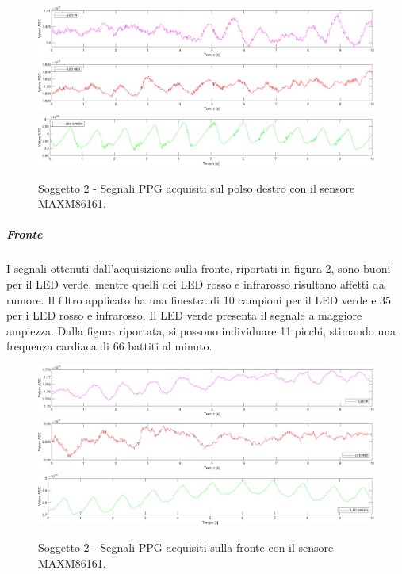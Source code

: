 \begin{figure}[h]
	\centering
	\includegraphics[width=1\linewidth]{ImageFiles/Misure Preliminari/Soggetto 2/maxm86161/polso_inferiore_ir_moving_avg}
	\includegraphics[width=1\linewidth]{ImageFiles/Misure Preliminari/Soggetto 2/maxm86161/polso_inferiore_red_moving_avg}
	\includegraphics[width=1\linewidth]{ImageFiles/Misure Preliminari/Soggetto 2/maxm86161/polso_inferiore_green_moving_avg}
	\caption{Soggetto 2 - Segnali PPG acquisiti sul polso destro con il sensore MAXM86161.}
	\label{fig:soggetto2_MAXM86161_polso}
\end{figure}

\clearpage

\subparagraph{Fronte}
I segnali ottenuti dall'acquisizione sulla fronte, riportati in figura \ref{fig:soggetto2_MAXM86161_fronte}, sono buoni per il LED verde, mentre quelli dei LED rosso e infrarosso risultano affetti da rumore. Il filtro applicato ha una finestra di 10 campioni per il LED verde e 35 per i LED rosso e infrarosso. Il LED verde presenta il segnale a maggiore ampiezza. Dalla figura riportata, si possono individuare 11 picchi, stimando una frequenza cardiaca di 66 battiti al minuto.

\begin{figure}[h]
	\centering
	\includegraphics[width=1\linewidth]{ImageFiles/Misure Preliminari/Soggetto 2/maxm86161/fronte_ir_moving_avg}
	\includegraphics[width=1\linewidth]{ImageFiles/Misure Preliminari/Soggetto 2/maxm86161/fronte_red_moving_avg}
	\includegraphics[width=1\linewidth]{ImageFiles/Misure Preliminari/Soggetto 2/maxm86161/fronte_green_moving_avg}
	\caption{Soggetto 2 - Segnali PPG acquisiti sulla fronte con il sensore MAXM86161.}
	\label{fig:soggetto2_MAXM86161_fronte}
\end{figure}


\clearpage